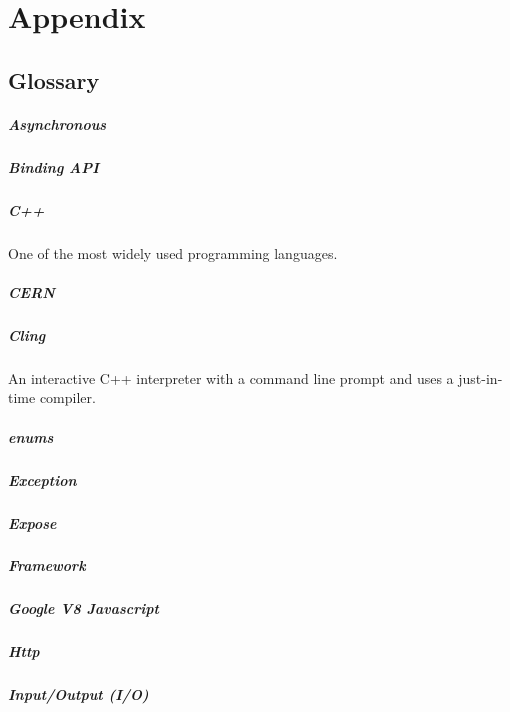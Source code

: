 \chapter{Appendix}
\section{Glossary}
\paragraph{Asynchronous}
\paragraph{Binding API}
\paragraph{C++}
One of the most widely used programming languages.
\paragraph{CERN}
\paragraph{Cling}
An interactive C++ interpreter with a command line prompt and uses a just-in-time compiler.
\paragraph{enums}
\paragraph{Exception}
\paragraph{Expose}
\paragraph{Framework}
\paragraph{Google V8 Javascript}
\paragraph{Http}
\paragraph{Input/Output (I/O)}
